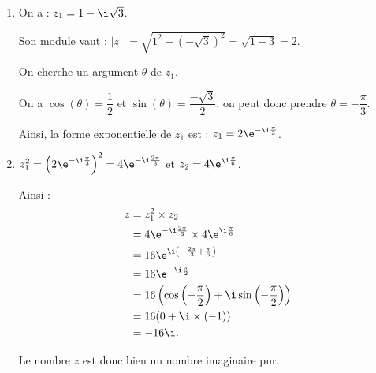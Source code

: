 \medskip

\begin{enumerate}
\item  On a : $z_1=1-\i\sqrt{3}$.

Son module vaut : $|z_1|=\sqrt{1^2+\left(-\sqrt{3}\right)^2}=\sqrt{1+3}=2$.

On cherche un argument $\theta$ de $z_1$.

On a $\cos(\theta)=\dfrac{1}{2}$ et $\sin(\theta)=\dfrac{-\sqrt{3}}{2}$, on peut donc prendre $\theta=-\dfrac{\pi}{3}$.

Ainsi, la forme exponentielle de $z_1$ est : $z_1=2\e^{-\i\frac{\pi}{3}}$.

\item $z_1^2=\left(2\e^{-\i\frac{\pi}{3}}\right)^2=4\e^{-\i\frac{2\pi}{3}}$ et $z_2=4\e^{\i\frac{\pi}{6}}$.

Ainsi :
\begin{align*}
z &= z_1^2\times z_2 \\
&= 4\e^{-\i\frac{2\pi}{3}}\times 4\e^{\i\frac{\pi}{6}} \\
&= 16\e^{\i\left(-\frac{2\pi}{3}+\frac{\pi}{6}\right)} \\
&= 16\e^{-\i\frac{\pi}{2}} \\
&= 16\left(\cos\left(-\frac{\pi}{2}\right)+\i\sin\left(-\frac{\pi}{2}\right)\right) \\
&= 16(0+\i\times(-1)) \\
&= -16\i.
\end{align*}

Le nombre $z$ est donc bien un nombre imaginaire pur.
\end{enumerate}
